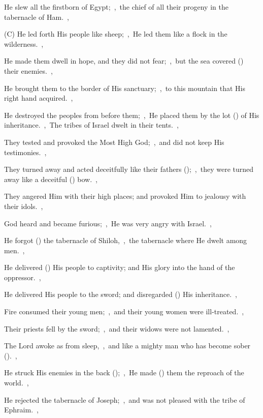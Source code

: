 \documentclass[12pt,twoside,a5paper]{article}
\begin{document}
\begin{halfparskip}
  He slew all the firstborn of Egypt;~\sep\ the chief of all their progeny in the tabernacle of Ham.~\sep

  (C) He led forth His people like sheep;~\sep\ He led them like a flock in the wilderness.~\sep

  He made them dwell in hope, and they did not fear;~\sep\ but the sea covered () their enemies.~\sep

  He brought them to the border of His sanctuary;~\sep\ to this mountain that His right hand acquired.~\sep

  He destroyed the peoples from before them;~\sep\ He placed them by the lot () of His inheritance.~\sep\ The tribes of Israel dwelt in their tents.~\sep

  They tested and provoked the Most High God;~\sep\ and did not keep His testimonies.~\sep

  They turned away and acted deceitfully like their fathers ();~\sep\ they were turned away like a deceitful () bow.~\sep

  They angered Him with their high places; and provoked Him to jealousy with their idols.~\sep

  God heard and became furious;~\sep\ He was very angry with Israel.~\sep

  He forgot () the tabernacle of Shiloh,~\sep\ the tabernacle where He dwelt among men.~\sep

  He delivered () His people to captivity; and His glory into the hand of the oppressor.~\sep


  He delivered His people to the sword; and disregarded () His inheritance.~\sep

  Fire consumed their young men;~\sep\ and their young women were ill-treated.~\sep

  Their priests fell by the sword;~\sep\ and their widows were not lamented.~\sep

  The Lord awoke as from sleep,~\sep\ and like a mighty man who has become sober ().~\sep

  He struck His enemies in the back ();~\sep\ He made () them the reproach of the world.~\sep

  He rejected the tabernacle of Joseph;~\sep\ and was not pleased with the tribe of Ephraim.~\sep


\end{halfparskip}
\end{document}
